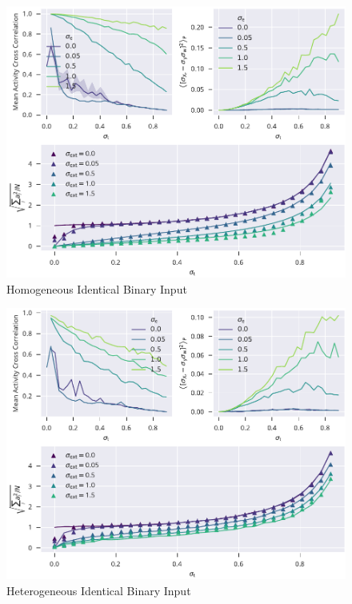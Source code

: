 \documentclass[10pt,a4paper]{article}
\begin{document}
	\begin{figure}[h]
		\includegraphics{../plots/homogeneous_identical_binary_input_compos.pdf}
		\caption{Homogeneous Identical Binary Input}
	\end{figure}
	\begin{figure}[h]
		\includegraphics{../plots/heterogeneous_identical_binary_input_compos.pdf}
		\caption{Heterogeneous Identical Binary Input}
	\end{figure}
	\newpage
\end{document}
